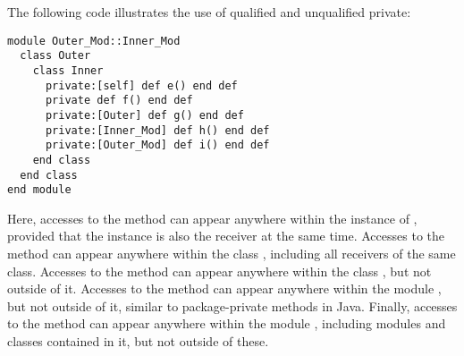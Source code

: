 \begin{itemize}
\example The following code illustrates the use of qualified and unqualified private: 
\begin{lstlisting}
module Outer_Mod::Inner_Mod
  class Outer
    class Inner
      private:[self] def e() end def
      private def f() end def
      private:[Outer] def g() end def
      private:[Inner_Mod] def h() end def
      private:[Outer_Mod] def i() end def
    end class
  end class
end module
\end{lstlisting}
Here, accesses to the method  can appear anywhere within the instance of , provided that the instance is also the receiver at the same time. Accesses to the method  can appear anywhere within the class , including all receivers of the same class. Accesses to the method  can appear anywhere within the class , but not outside of it. Accesses to the method  can appear anywhere within the module , but not outside of it, similar to package-private methods in Java. Finally, accesses to the method  can appear anywhere within the module , including modules and classes contained in it, but not outside of these.

\end{itemize}

